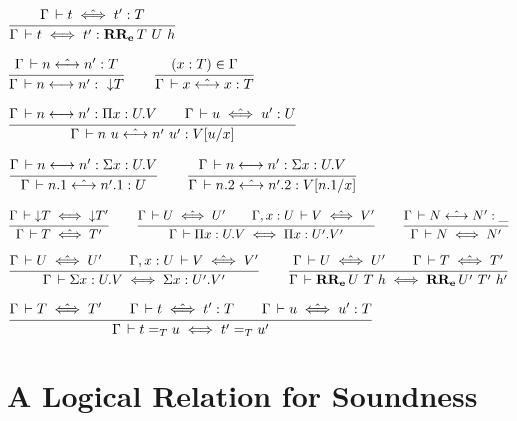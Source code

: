 \documentclass[a4paper,english]{lipics-utf8x}
\begin{document}
  \begin{center}
  \(
    \ru{\Gamma \der t \hiff t' : T
      }{\Gamma \der t \iff t' : \RRe{T}{U}{h}}
  \)
  \end{center}


  \begin{center}
  \(
    \ru{\Gamma \der n \hsteq n' : T
      }{\Gamma \der n \steq n' :\ \red T}
    \qquad
    \ru{(x:T) \in \Gamma
      }{\Gamma \der x \hsteq x : T}
  \)
  \end{center}

  \begin{center}
  \(
    \ru{\Gamma \der n \steq n' : \Pi x:U.V \qquad
        \Gamma \der u \hiff u' : U
      }{\Gamma \der n~u \hsteq n'~u' : V[u/x]}
  \)
  \end{center}

  \begin{center}
  \(
    \ru{\Gamma \der n \steq n' : \Sigma x:U.V
      }{\Gamma \der n.1 \hsteq n'.1 : U}
    \qquad
    \ru{\Gamma \der n \steq n' : \Sigma x:U.V
      }{\Gamma \der n.2 \hsteq n'.2 : V[n.1/x]}
  \)
  \end{center}


  \begin{center}
  \(
    \ru{\Gamma \der \red T \iff \red T'
      }{\Gamma \der T \hiff T'}
    \qquad
    \ru{\Gamma \der U \hiff U' \qquad
        \Gamma, x:U \der V \hiff V'
      }{\Gamma \der \Pi x:U.V \iff \Pi x:U'.V'}
    \qquad
    \ru{\Gamma \der N \hsteq N' : \_
      }{\Gamma \der N \iff N'}
  \)
  \end{center}

  \begin{center}
  \(
    \ru{\Gamma \der U \hiff U' \qquad
        \Gamma, x:U \der V \hiff V'
      }{\Gamma \der \Sigma x:U.V \iff \Sigma x:U'.V'}
    \qquad
    \ru{\Gamma \der U \hiff U' \qquad
        \Gamma \der T \hiff T'
      }{\Gamma \der \RRe{U}{T}{h} \iff \RRe{U'}{T'}{h'}}
  \)
  \end{center}

  \begin{center}
  \(
    \ru{\Gamma \der T \hiff T' \qquad
        \Gamma \der t \hiff t' : T \qquad
        \Gamma \der u \hiff u' : T
      }{\Gamma \der t =_T u \iff t' =_T u'}
  \)
  \end{center}

  \section{A Logical Relation for Soundness}
\end{document}
